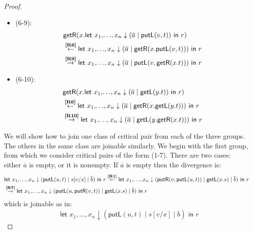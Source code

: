 \documentclass[twoside,11pt,final]{entics}
\newcommand{\getl}{\mathsf{getL}}
\newcommand{\putr}{\mathsf{putR}}
\newcommand{\getr}{\mathsf{getR}}
\newcommand{\putl}{\mathsf{putL}}
\newcommand{\from}{\leftarrow}
\newcommand{\asn}{\downarrow}
\newcommand{\seq}{,\!\ldots\!,}
\begin{document}
\begin{proof}
\begin{itemize}
\begin{align*}
      \\& \overset{\text{\bf[R8]}}{\to}\textsf{let } x_1 \seq x_n \asn (\overline{a} \mid \getl(x.\putr(v,t))) \textsf{ in } r 
    \end{align*}
  \item[] (6-9): \vspace{-2em}
    \begin{align*}
      & \getr(x.\textsf{let } x_1 \seq x_n \asn (\overline{a} \mid \putl(v,t)) \textsf{ in } r) 
      \\& \overset{\text{\bf[R6]}}{\from} \textsf{let } x_1 \seq x_n \asn (\overline{a} \mid \getr(x.\putl(v,t))) \textsf{ in } r 
      \\& \overset{\text{\bf[R9]}}{\to} \textsf{let } x_1 \seq x_n \asn (\overline{a} \mid \putl(v,\getr(x.t))) \textsf{ in } r 
    \end{align*}
  \item[] (6-10): \vspace{-2em}
    \begin{align*}
      & \getr(x.\textsf{let } x_1 \seq x_n \asn (\overline{a} \mid \getl(y.t)) \textsf{ in } r) 
      \\& \overset{\text{\bf[R6]}}{\from} \textsf{let } x_1 \seq x_n \asn (\overline{a} \mid \getr(x.\getl(y.t))) \textsf{ in } r 
      \\& \overset{\text{\bf[R10]}}{\to} \textsf{let } x_1 \seq x_n \asn (\overline{a} \mid \getl(y. \getr(x.t))) \textsf{ in } r 
    \end{align*}
  \end{itemize}
  We will show how to join one class of critical pair from each of the three groups. The others in the same class are joinable similarly. We begin with the first group, from which we consider critical pairs of the form (1-7). There are two cases: either $\overline{a}$ is empty, or it is nonempty. If $\overline{a}$ is empty then the divergence is:
  \begin{align*}
    & \textsf{let } x_1 \seq x_n \asn (\putl(u,t) \mid s[v/x] \mid \overline{b}) \textsf{ in } r 
    \overset{\text{\bf[R1]}}{\from} \textsf{let } x_1 \seq x_n \asn (\putr(v,\putl(u,t)) \mid \getl(x.s) \mid \overline{b}) \textsf{ in } r 
    \\& \overset{\text{\bf[R7]}}{\to} \textsf{let } x_1 \seq x_n \asn (\putl(u,\putr(v,t)) \mid \getl(x.s) \mid \overline{b}) \textsf{ in } r 
  \end{align*}
  which is joinable as in:
  \begin{align*}
    & \textsf{let } x_1 \seq x_n \asn (\putl(u,t) \mid s[v/x] \mid \overline{b}) \textsf{ in } r

\end{align*}
\end{proof}
\end{document}
